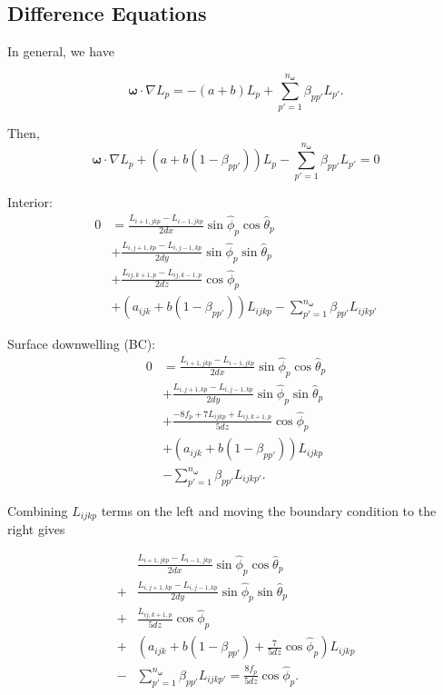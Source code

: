 \documentclass[ms,cpyr,lof,lot]{uathesis}
\renewcommand\vec\bm
\begin{document}
\subsection{Difference Equations}
\label{sec:difference_equations}


In general, we have

\begin{equation*}
  \vec{\omega} \cdot \nabla L_p = -(a+b) L_p + \sum_{p'=1}^{n_{\vec{\omega}}} \beta_{pp'}L_{p'}.
\end{equation*}

Then,
\begin{equation*}
  \vec{\omega} \cdot \nabla L_p + (a+b(1-\beta_{pp'}))L_p - \sum_{p'=1}^{n_{\vec{\omega}}} \beta_{pp'} L_{p'} = 0
\end{equation*}

Interior:
\begin{equation*}
  \begin{aligned}
    0 &= \frac{L_{i+1,jkp}-L_{i-1,jkp}}{2dx}\sin\hat{\phi}_p\cos\hat{\theta}_p \\
    &+ \frac{L_{i,j+1,kp}-L_{i,j-1,kp}}{2dy}\sin\hat{\phi}_p\sin\hat{\theta}_p \\
    &+ \frac{L_{ij,k+1,p}-L_{ij,k-1,p}}{2dz}\cos\hat{\phi}_p \\
    &+ (a_{ijk}+b(1-\beta_{pp'}))L_{ijkp}  - \sum_{p'=1}^{n_{\vec{\omega}}} \beta_{pp'} L_{ijkp'}
  \end{aligned}
\end{equation*}

Surface downwelling (BC):
\begin{equation*}
  \begin{aligned}
    0 &= \frac{L_{i+1,jkp}-L_{i-1,jkp}}{2dx}\sin\hat{\phi}_p\cos\hat{\theta}_p \\
    &+ \frac{L_{i,j+1,kp}-L_{i,j-1,kp}}{2dy}\sin\hat{\phi}_p\sin\hat{\theta}_p \\
    &+ \frac{-8f_p + 7L_{ijkp} + L_{ij,k+1,p}}{5dz}\cos\hat{\phi}_p \\
    &+ (a_{ijk}+b(1-\beta_{pp'}))L_{ijkp} \\
    &- \sum_{p'=1}^{n_{\vec{\omega}}} \beta_{pp'} L_{ijkp'}.
  \end{aligned}
\end{equation*}

Combining $L_{ijkp}$ terms on the left and moving the boundary condition to the
right gives

\begin{equation*}
  \begin{aligned}
    &\frac{L_{i+1,jkp}-L_{i-1,jkp}}{2dx}\sin\hat{\phi}_p\cos\hat{\theta}_p \\
    + &\frac{L_{i,j+1,kp}-L_{i,j-1,kp}}{2dy}\sin\hat{\phi}_p\sin\hat{\theta}_p \\
    + &\frac{L_{ij,k+1,p}}{5dz}\cos\hat{\phi}_p \\
    + &(a_{ijk}+b(1-\beta_{pp'}) + \frac{7}{5dz} \cos\hat{\phi}_p)L_{ijkp} \\
    - &\sum_{p'=1}^{n_{\vec{\omega}}} \beta_{pp'} L_{ijkp'} = \frac{8f_p}{5dz} \cos\hat{\phi}_p.
  \end{aligned}
\end{equation*}
\end{document}
